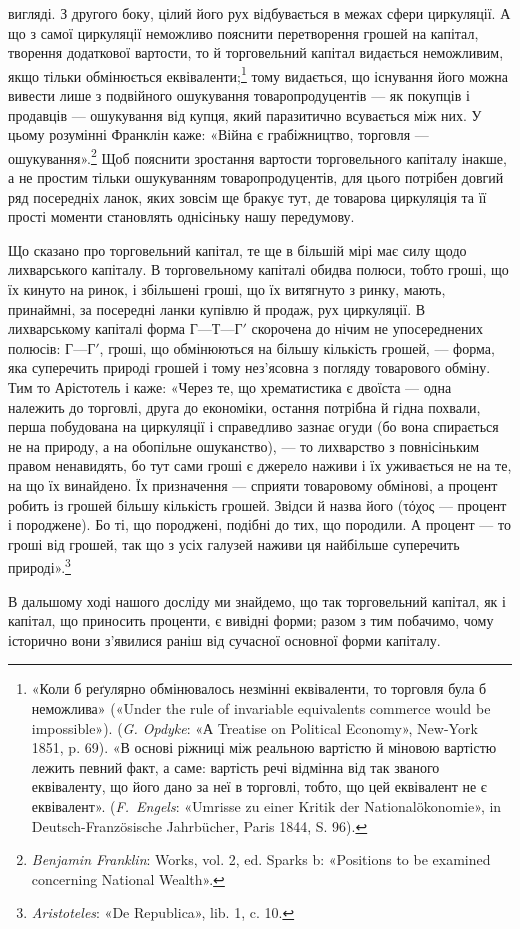 \parcont{}  %
вигляді. З другого боку, цілий його рух відбувається в межах
сфери циркуляції. А що з самої циркуляції неможливо пояснити
перетворення грошей на капітал, творення додаткової вартости,
то й торговельний капітал видається неможливим, якщо тільки
обмінюється еквіваленти;\footnote{
«Коли б реґулярно обмінювалось незмінні еквіваленти, то торговля
була б неможлива» («Under the rule of invariable equivalents commerce
would be impossible»). (\emph{G. Opdyke}\emph{}: «А Treatise on Political Economy»,
New-York 1851, p. 69). «В основі ріжниці між реальною вартістю й
міновою вартістю лежить певний факт, а саме: вартість речі відмінна
від так званого еквіваленту, що його дано за неї в торговлі, тобто, що
цей еквівалент не є еквівалент». (\emph{F.~Engels}: «Umrisse zu einer Kritik
der Nationalökonomie», in Deutsch-Französische Jahrbücher, Paris 1844,
S. 96).
} тому видається, що існування його
можна вивести лише з подвійного ошукування товаропродуцентів —
як покупців і продавців — ошукування від купця, який паразитично
всувається між них. У цьому розумінні Франклін каже:
«Війна є грабіжництво, торговля — ошукування».\footnote{
\emph{Benjamin Franklin}: Works, vol. 2, ed. Sparks b: «Positions to be
examined concerning National Wealth».
} Щоб пояснити
зростання вартости торговельного капіталу інакше, а не
простим тільки ошукуванням товаропродуцентів, для цього потрібен
довгий ряд посередніх ланок, яких зовсім ще бракує тут,
де товарова циркуляція та її прості моменти становлять однісіньку
нашу передумову.

Що сказано про торговельний капітал, те ще в більшій мірі
має силу щодо лихварського капіталу. В торговельному капіталі
обидва полюси, тобто гроші, що їх кинуто на ринок, і збільшені
гроші, що їх витягнуто з ринку, мають, принаймні, за посередні
ланки купівлю й продаж, рух циркуляції. В лихварському капіталі
форма $Г — Т — Г'$ скорочена до нічим не упосереднених полюсів:
$Г — Г'$, гроші, що обмінюються на більшу кількість грошей, —
форма, яка суперечить природі грошей і тому нез’ясовна з погляду
товарового обміну. Тим то Арістотель і каже: «Через те,
що хрематистика є двоїста — одна належить до торговлі, друга до
економіки, остання потрібна й гідна похвали, перша побудована
на циркуляції і справедливо зазнає огуди (бо вона спирається не
на природу, а на обопільне ошуканство), — то лихварство з повнісіньким
правом ненавидять, бо тут сами гроші є джерело наживи
і їх уживається не на те, на що їх винайдено. Їх призначення —
сприяти товаровому обмінові, а процент робить із грошей більшу
кількість грошей. Звідси й назва його (\textgreek{τόχος} — процент і породжене).
Бо ті, що породжені, подібні до тих, що породили. А процент
— то гроші від грошей, так що з усіх галузей наживи ця
найбільше суперечить природі».\footnote{
\emph{Aristoteles}: «De Republica», lib. 1, c. 10.
}

В дальшому ході нашого досліду ми знайдемо, що так торговельний
капітал, як і капітал, що приносить проценти, є вивідні
форми; разом з тим побачимо, чому історично вони з’явилися
раніш від сучасної основної форми капіталу.

